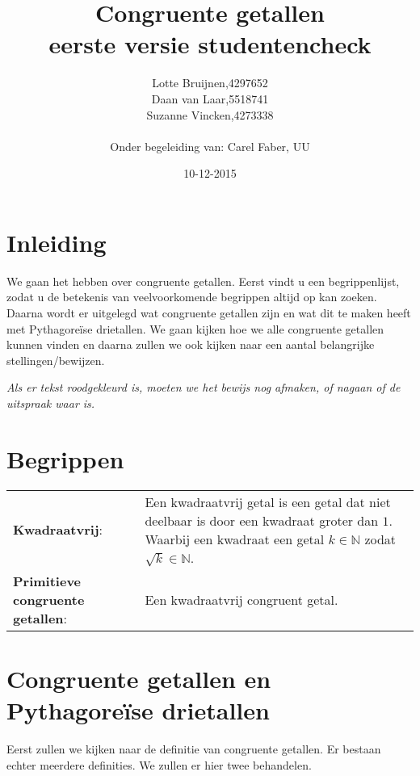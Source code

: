 \documentclass[12pt,reqno]{article}
\title{\textbf{Congruente getallen}\\
		\small{eerste versie studentencheck}}
\author{
	\begin{tabular}{ l l }
		Lotte Bruijnen, & 4297652 \\
		Daan van Laar, & 5518741 \\
		Suzanne Vincken, & 4273338
	\end{tabular}\\
	Onder begeleiding van: Carel Faber, UU
}
\date{10-12-2015}
\newcommand*{\NN}{\ensuremath{\mathbb{N}}}
\begin{document}
	\maketitle
	\allowdisplaybreaks
	
	
	\section{Inleiding}
	We gaan het hebben over congruente getallen. Eerst vindt u een begrippenlijst, zodat u de betekenis van veelvoorkomende begrippen altijd op kan zoeken. Daarna wordt er uitgelegd wat congruente getallen zijn en wat dit te maken heeft met Pythagore\"ise drietallen. We gaan kijken hoe we alle congruente getallen kunnen vinden en daarna zullen we ook kijken naar een aantal belangrijke stellingen/bewijzen.
	
	\textit{Als er tekst roodgekleurd is, moeten we het bewijs nog afmaken, of nagaan of de uitspraak waar is.}
	
	
	\section{Begrippen}
	\begin{tabular}{ p{} p{10cm} }
		\textbf{Kwadraatvrij}: \cite{Beukers} & Een kwadraatvrij getal is een getal dat niet deelbaar is door een kwadraat groter dan $1$. Waarbij een kwadraat een getal $k\in\NN$ zodat $\sqrt{k}\in\NN$. \\
		\textbf{Primitieve congruente getallen}: & Een kwadraatvrij congruent getal. \\
	\end{tabular}
	
	
	\newpage
	\section{Congruente getallen en Pythagore\"{i}se drietallen}	
	Eerst zullen we kijken naar de definitie van congruente getallen. Er bestaan echter meerdere definities. We zullen er hier twee behandelen.\\
	
\end{document}
